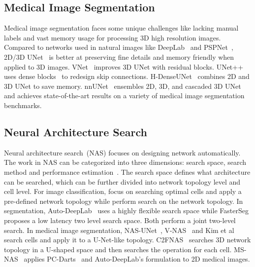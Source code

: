 \documentclass[final]{cvpr}
\begin{document}
\subsection{Medical Image Segmentation}
 Medical image segmentation faces some unique challenges like lacking manual labels and vast memory usage for processing 3D high resolution images. Compared to networks used in natural images like DeepLab~\cite{chen2018encoder} and PSPNet~\cite{zhao2017psp}, 2D/3D UNet~\cite{ronneberger2015unet,cciccek20163d} is better at preserving fine details and memory friendly when applied to 3D images.
 VNet~\cite{milletari2016v} improves 3D UNet with residual blocks. UNet++~\cite{zhou2019unet++} uses dense blocks~\cite{huang2017densely} to redesign skip connections. H-DenseUNet~\cite{li2018h} combines 2D and 3D UNet to save memory. nnUNet~\cite{isensee2019nnunet} ensembles 2D, 3D, and cascaded 3D UNet and achieves state-of-the-art results on a variety of medical image segmentation benchmarks. 
\subsection{Neural Architecture Search}
Neural architecture search~(NAS) focuses on designing network automatically. The work in NAS can be categorized into three dimensions: search space, search method and performance estimation~\cite{elsken2018neural}. The search space defines what architecture can be searched, which can be further divided into network topology level and cell level. For image classification, \cite{liu2018darts,zoph2018learning,liu2018progressive,real2019regularized,pham2018efficient,gu2020dots} focus on searching optimal cells and apply a pre-defined network topology while \cite{fang2020densely,xie2019exploring} perform search on the network topology. In segmentation, Auto-DeepLab~\cite{liu2019auto} uses a highly flexible search space while FasterSeg~\cite{chen2019fasterseg} proposes a low latency two level search space. Both perform a joint two-level search.  In medical image segmentation, NAS-UNet~\cite{weng2019nasunet}, V-NAS~\cite{zhu2019vnas} and Kim et al~\cite{kim2019scalable} search cells and apply it to a U-Net-like topology. C2FNAS~\cite{yu2020c2fnas} searches 3D network topology in a U-shaped space and then searches the operation for each cell. MS-NAS~\cite{yan2020ms} applies PC-Darts~\cite{xu2019pc} and Auto-DeepLab's formulation to 2D medical images.
\end{document}
